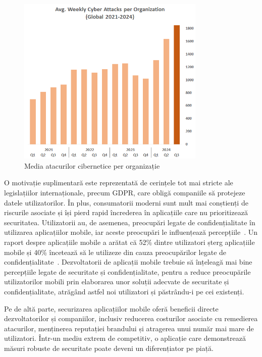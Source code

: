 \documentclass[runningheads]{llncs}
\begin{document}
\begin{figure}[H]
  \centering
  \includegraphics[width=0.8\textwidth]{checkpointGraf.png}
  \caption{Media atacurilor cibernetice per organizație~\cite{checkpoint}}
  \label{fig:dataset-sample}
\end{figure}

O motivație suplimentară este reprezentată de cerințele tot mai stricte ale legislațiilor internaționale, precum GDPR, care obligă companiile să protejeze datele utilizatorilor. În plus, consumatorii moderni sunt mult mai conștienți de riscurile asociate și își pierd rapid încrederea în aplicațiile care nu prioritizează securitatea. Utilizatorii au, de asemenea, preocupări legate de confidențialitate în utilizarea aplicațiilor mobile, iar aceste preocupări le influențează percepțiile~\cite{SHAW201944}. Un raport despre aplicațiile mobile a arătat că 52\% dintre utilizatori șterg aplicațiile mobile și 40\% încetează să le utilizeze din cauza preocupărilor legate de confidențialitate~\cite{mef}. Dezvoltatorii de aplicații mobile trebuie să înțeleagă mai bine percepțiile legate de securitate și confidențialitate, pentru a reduce preocupările utilizatorilor mobili prin elaborarea unor soluții adecvate de securitate și confidențialitate, atrăgând astfel noi utilizatori și păstrându-i pe cei existenți.

Pe de altă parte, securizarea aplicațiilor mobile oferă beneficii directe dezvoltatorilor și companiilor, inclusiv reducerea costurilor asociate cu remedierea atacurilor, menținerea reputației brandului și atragerea unui număr mai mare de utilizatori. Într-un mediu extrem de competitiv, o aplicație care demonstrează măsuri robuste de securitate poate deveni un diferențiator pe piață.
\end{document}
